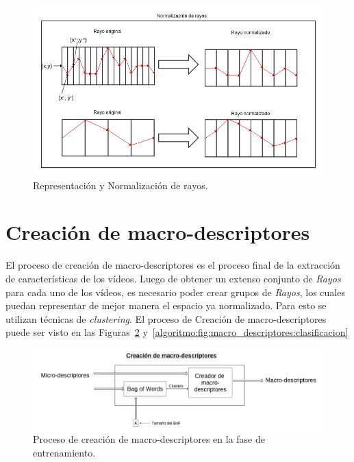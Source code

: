 	\begin{figure}[bt]
		\centering
    		\includegraphics[width=1\textwidth]{Figuras/Diagramas/normalizacion_de_rayos.png}
  		\caption{Representación y Normalización de rayos.}
  		\label{algoritmo:fig:normalizacion}
	\end{figure}	

	
\newpage	
\section{Creación de macro-descriptores}
\label{sec:macro-descriptores}
El proceso de creación de macro-descriptores es el proceso final de la extracción de características de los vídeos. Luego de obtener un extenso conjunto de \textit{Rayos} para cada uno de los vídeos, es necesario poder crear grupos de \textit{Rayos}, los cuales puedan representar de mejor manera el espacio ya normalizado. Para esto se utilizan técnicas de \textit{clustering}. El proceso de Creación de macro-descriptores puede ser visto en las Figuras~\ref{algoritmo:fig:macro_descriptores:entrenamiento} y~\ref{algoritmo:fig:macro_descriptores:clasificacion}

	\begin{figure}[bt]
		\centering
    		\includegraphics[width=1\textwidth]{Figuras/Diagramas/Extractor_macrodescriptores_entrenamiento.png}
  		\caption{Proceso de creación de macro-descriptores en la fase de entrenamiento.}
  		\label{algoritmo:fig:macro_descriptores:entrenamiento}
	\end{figure}	
	
